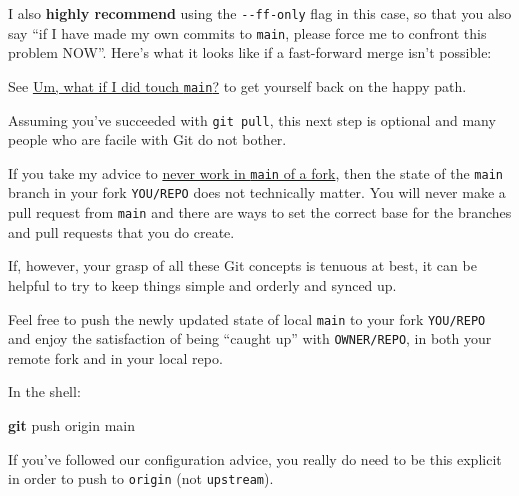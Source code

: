 \documentclass[
]{book}
\newenvironment{Shaded}{\begin{snugshade}}{\end{snugshade}}
\newcommand{\AttributeTok}[1]{\textcolor[rgb]{0.13,0.29,0.53}{#1}}
\newcommand{\ExtensionTok}[1]{#1}
\newcommand{\FunctionTok}[1]{\textcolor[rgb]{0.13,0.29,0.53}{\textbf{#1}}}
\newcommand{\NormalTok}[1]{#1}
\newcommand{\OperatorTok}[1]{\textcolor[rgb]{0.81,0.36,0.00}{\textbf{#1}}}
\begin{document}
I also \textbf{highly recommend} using the \texttt{-\/-ff-only} flag in this case, so that you also say ``if I have made my own commits to \texttt{main}, please force me to confront this problem NOW''.
Here's what it looks like if a fast-forward merge isn't possible:

\begin{Shaded}
\end{Shaded}

See \hyperref[touched-main]{Um, what if I did touch \texttt{main}?} to get yourself back on the happy path.

Assuming you've succeeded with \texttt{git\ pull}, this next step is optional and many people who are facile with Git do not bother.

If you take my advice to \hyperref[fork-dont-touch-main]{never work in \texttt{main} of a fork}, then the state of the \texttt{main} branch in your fork \texttt{YOU/REPO} does not technically matter.
You will never make a pull request from \texttt{main} and there are ways to set the correct base for the branches and pull requests that you do create.

If, however, your grasp of all these Git concepts is tenuous at best, it can be helpful to try to keep things simple and orderly and synced up.

Feel free to push the newly updated state of local \texttt{main} to your fork \texttt{YOU/REPO} and enjoy the satisfaction of being ``caught up'' with \texttt{OWNER/REPO}, in both your remote fork and in your local repo.

In the shell:

\begin{Shaded}
\begin{Highlighting}[]
\FunctionTok{git}\NormalTok{ push origin main}
\end{Highlighting}
\end{Shaded}

If you've followed our configuration advice, you really do need to be this explicit in order to push to \texttt{origin} (not \texttt{upstream}).
\end{document}
